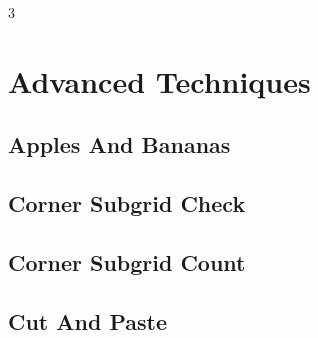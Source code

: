 \documentclass[8pt]{extarticle}
\begin{document}
\pagebreak
\begin{multicols*}{3}

\section{Advanced Techniques}

\subsection{Apples And Bananas}
\begin{caixaenunciado}

\end{caixaenunciado}
\vspace{0.3cm}


\subsection{Corner Subgrid Check}
\begin{caixaenunciado}

\end{caixaenunciado}
\vspace{0.3cm}


\subsection{Corner Subgrid Count}
\begin{caixaenunciado}

\end{caixaenunciado}
\vspace{0.3cm}


\subsection{Cut And Paste}
\begin{caixaenunciado}

\end{caixaenunciado}
\vspace{0.3cm}



\end{multicols*}
\end{document}
